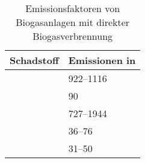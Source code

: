{
\renewcommand{\arraystretch}{1.1}
\begin{table}[H]
	\begin{center}
		\caption{Emissionsfaktoren von Biogasanlagen mit direkter Biogasverbrennung \parencite{Paolini2018}}
		\begin{tabu} to 0.49\textwidth {X X[1.5, r]}
			\hline
			Schadstoff	& Emissionen in \si[per-mode=symbol]{\mgkwh}					\\ \hline
					& \SIrange{922}{1116}{\relax}                               	\\
				& \SI{90}{\relax}                                       		\\
				& \SIrange{727}{1944}{\relax}                               	\\
				& \SIrange{36}{76}{\relax}                                  	\\
				& \SIrange{31}{50}{\relax}                                  	\\ \hline
		\end{tabu}
		\label{tab:tab_air-pollutants}
	\end{center}
\end{table}
}